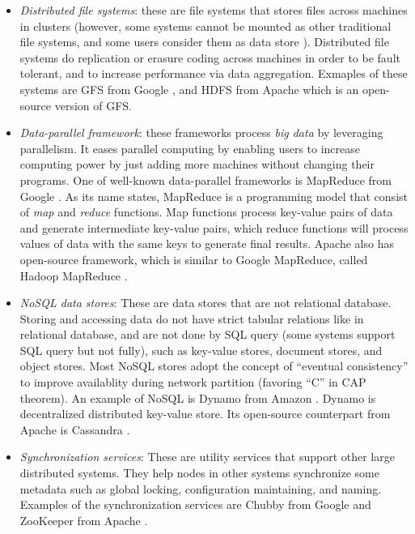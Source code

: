 \begin{itemize}

\item \textit{Distributed file systems}: these are file systems that stores
files across machines in clusters (however, some systems cannot be mounted as
other traditional file systems, and some users consider them as data store
\cite{HadoopStorage}). Distributed file systems do replication or erasure coding
across machines in order to be fault tolerant, and to increase performance via
data aggregation. Exmaples of these systems are GFS from Google
\cite{Ghemawat+03-GoogleFS}, and HDFS from Apache \cite{Shvachko+10-HDFSPaper}
which is an open-source version of GFS.

\item \textit{Data-parallel framework}: these frameworks process \textit{big
data} by leveraging parallelism. It eases parallel computing by enabling users
to increase computing power by just adding more machines without changing their
programs.  One of well-known data-parallel frameworks is MapReduce from Google
\cite{DeanGhemawat04-MapReduce}.  As its name states, MapReduce is a
programming model that consist of \textit{map} and \textit{reduce} functions.
Map functions process key-value pairs of data and generate intermediate
key-value pairs, which reduce functions will process values of data with the
same keys to generate final results. Apache also has open-source framework,
which is similar to Google MapReduce, called Hadoop MapReduce \cite{HadoopWeb}.

\item \textit{NoSQL data stores}: These are data stores that are not relational
database. Storing and accessing data do not have strict tabular relations like
in relational database, and are not done by SQL query (some systems support SQL
query but not fully), such as key-value stores, document stores, and object
stores. Most NoSQL stores adopt the concept of ``eventual consistency'' to
improve availablity during network partition (favoring ``C'' in CAP theorem). An
example of NoSQL is Dynamo from Amazon \cite{DeCandia+07-Dynamo}. Dynamo is
decentralized distributed key-value store. Its open-source counterpart from
Apache is Cassandra \cite{Lakshman+09-Cassandra}.

\item \textit{Synchronization services}: These are utility services that support
other large distributed systems. They help nodes in other systems synchronize
some metadata such as global locking, configuration maintaining, and naming.
Examples of the synchronization services are Chubby from Google
\cite{Burrows06-Chubby} and ZooKeeper from Apache \cite{Hunt+10-ZooKeeperPaper}.

\end{itemize}
